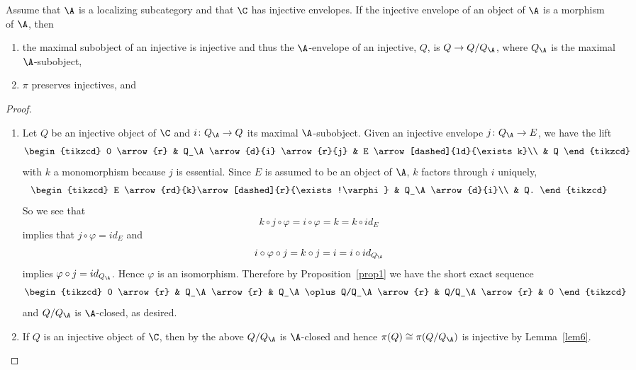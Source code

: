 \begin{cor}\label{cor2}
  Assume that $\A$ is a localizing subcategory and that $\C$ has injective envelopes.
  If the injective envelope of an object of $\A$ is a morphism of $\A$, then
  \begin{enumerate}
  \item\label{cor2.1}
    the maximal subobject of an injective is injective and thus the $\A$-envelope of an injective, $Q$, is $Q \rightarrow Q/Q_\A$, where $Q_\A$ is the maximal $\A$-subobject, 
  \item\label{cor2.2}
    $\pi$ preserves injectives, and
  \end{enumerate}
  \begin{proof}
    \begin{enumerate}
    \item
      Let $Q$ be an injective object of $\C$ and $i \colon Q_\A \rightarrow Q$ its maximal $\A$-subobject.
      Given an injective envelope $j \colon Q_\A \rightarrow E$, we have the lift
      $$\begin{tikzcd}
        0 \arrow{r} & Q_\A \arrow{d}{i} \arrow{r}{j} & E \arrow[dashed]{ld}{\exists k}\\
        & Q
      \end{tikzcd}$$
      with $k$ a monomorphism because $j$ is essential.
      Since $E$ is assumed to be an object of $\A$, $k$ factors through $i$ uniquely,
      $$\begin{tikzcd}
        E \arrow{rd}{k}\arrow[dashed]{r}{\exists !\varphi} & Q_\A\arrow{d}{i}\\
        & Q.
      \end{tikzcd}$$
      So we see that
      $$k \circ j \circ \varphi = i \circ \varphi = k = k \circ id_E$$
      implies that  $j \circ \varphi = id_E$
      and
      $$i \circ \varphi \circ j = k \circ j = i = i \circ id_{Q_\A}$$
      implies $\varphi \circ j = id_{Q_\A}$.
      Hence $\varphi$ is an isomorphism.
      Therefore by Proposition~\ref{prop1} we have the short exact sequence
      $$\begin{tikzcd}
        0 \arrow{r} & Q_\A \arrow{r} & Q_\A \oplus Q/Q_\A \arrow{r} & Q/Q_\A \arrow{r} & 0
      \end{tikzcd}$$
      and $Q/Q_\A$ is $\A$-closed, as desired.
    \item
      If $Q$ is an injective object of $\C$, then by the above $Q/Q_\A$ is $\A$-closed and hence $\pi(Q) \cong \pi(Q/Q_\A)$ is injective by Lemma~\ref{lem6}.
      

\end{enumerate}
\end{proof}
\end{cor}
